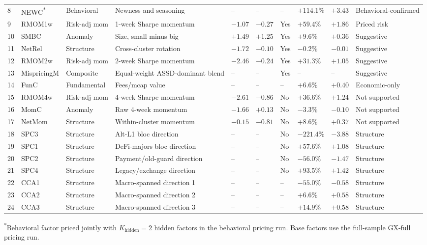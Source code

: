 \documentclass[11pt,a4paper]{article}
\begin{document}
\begin{center}
\begin{longtable}{C{0.03\textwidth}L{0.095\textwidth}L{0.105\textwidth}L{0.22\textwidth}R{0.065\textwidth}R{0.07\textwidth}C{0.06\textwidth}R{0.08\textwidth}R{0.055\textwidth}L{0.12\textwidth}}
8 & NEWC\textsuperscript{*} & Behavioral & Newness and seasoning & -- & -- & -- & $+114.1\%$ & $+3.43$ & Behavioral-confirmed \\
9 & RMOM1w & Risk-adj mom & 1-week Sharpe momentum & $-1.07$ & $-0.27$ & Yes & $+59.4\%$ & $+1.86$ & Priced risk \\
10 & SMBC & Anomaly & Size, small minus big & $+1.49$ & $+1.25$ & Yes & $+9.6\%$ & $+0.36$ & Suggestive \\
11 & NetRel & Structure & Cross-cluster rotation & $-1.72$ & $-0.10$ & Yes & $-0.2\%$ & $-0.01$ & Suggestive \\
12 & RMOM2w & Risk-adj mom & 2-week Sharpe momentum & $-2.46$ & $-0.24$ & Yes & $+31.3\%$ & $+1.05$ & Suggestive \\
13 & Mispricing\newline M & Composite & Equal-weight ASSD-dominant blend & -- & -- & Yes & -- & -- & Suggestive \\
14 & FunC & Fundamental & Fees/mcap value & -- & -- & -- & $+6.6\%$ & $+0.40$ & Economic-only \\
15 & RMOM4w & Risk-adj mom & 4-week Sharpe momentum & $-2.61$ & $-0.86$ & No & $+36.6\%$ & $+1.24$ & Not supported \\
16 & MomC & Anomaly & Raw 4-week momentum & $-1.66$ & $+0.13$ & No & $-3.3\%$ & $-0.10$ & Not supported \\
17 & NetMom & Structure & Within-cluster momentum & $-0.15$ & $-0.81$ & No & $+8.6\%$ & $+0.37$ & Not supported \\
18 & SPC3 & Structure & Alt-L1 bloc direction & -- & -- & No & $-221.4\%$ & $-3.88$ & Structure \\
19 & SPC1 & Structure & DeFi-majors bloc direction & -- & -- & No & $+57.6\%$ & $+1.08$ & Structure \\
20 & SPC2 & Structure & Payment/old-guard direction & -- & -- & No & $-56.0\%$ & $-1.47$ & Structure \\
21 & SPC4 & Structure & Legacy/exchange direction & -- & -- & No & $+93.5\%$ & $+1.42$ & Structure \\
22 & CCA1 & Structure & Macro-spanned direction 1 & -- & -- & -- & $-55.0\%$ & $-0.58$ & Structure \\
23 & CCA2 & Structure & Macro-spanned direction 2 & -- & -- & -- & $+6.6\%$ & $+0.58$ & Structure \\
24 & CCA3 & Structure & Macro-spanned direction 3 & -- & -- & -- & $+14.9\%$ & $+0.58$ & Structure \\
\bottomrule
\end{longtable}
\end{center}
\smallskip
{\small \textsuperscript{*}Behavioral factor priced jointly with $K_{\text{hidden}}=2$ hidden factors in the behavioral pricing run. Base factors use the full-sample GX-full pricing run.}
\end{document}
